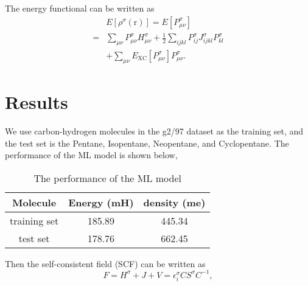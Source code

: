 \documentclass[%
twocolumn,
amsmath,amssymb,
groupedaddress,
reprint,%
]{revtex4-2}
\renewcommand{\>}{\rangle}
\newcommand{\<}{\langle}
\newcommand{\nl}{\nonumber \\}
\newcommand{\XC}{\mathrm{XC}}
\newcommand{\brm}[1]{\bm{\mathrm{#1}}}
\begin{document}
The energy functional can be written as
\begin{align}
      & E[\rho^{{\sigma}}(\brm{r})] = E[P^{\sigma}_{\mu \nu}] \nl
    = & \sum_{\mu \nu} P^{\sigma}_{\mu \nu} H^{\sigma}_{\mu \nu} + \frac{1}{2} \sum_{ijkl} P^{\sigma}_{ij} J^{\sigma}_{ijkl} P^{\sigma}_{kl}  \nl
      & + \sum_{\mu \nu}  E_{\XC}[P^{\sigma}_{\mu \nu}] P^{\sigma}_{\mu \nu}.
\end{align}

\section{Results}
We use carbon-hydrogen molecules in the g2/97 dataset as the training set, and the test set is the Pentane, Isopentane, Neopentane, and Cyclopentane.
%
The performance of the ML model is shown below,
\begin{table}[h]
    \centering
    \begin{tabular}{c|c|c}
        \hline
        Molecule     & Energy (mH) & density (me) \\
        \hline
        training set & 185.89            & 445.34       \\
        test set     & 178.76            & 662.45       \\
        \hline
    \end{tabular}
    \caption{The performance of the ML model}
\end{table}

Then the self-consistent field (SCF) can be written as
\begin{equation}
    F = H^{\sigma} + J + V = \epsilon^{\sigma}_{i} C S^{\sigma} C^{-1},
\end{equation}
\end{document}
